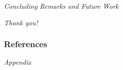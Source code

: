 

\begin{frame}[c]{\textit{Concluding Remarks and Future Work}}

\end{frame}


\begin{frame}[c]{\textit{Thank you!}}

\end{frame}


\begin{frame}[allowframebreaks] %

\frametitle{References}

\end{frame}




\begin{frame}[c]{\textit{Appendix}}

\end{frame}




